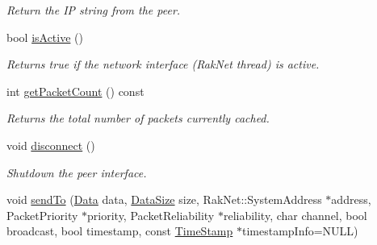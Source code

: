 \begin{DoxyCompactItemize}
\begin{DoxyCompactList}\small\item\em Return the I\-P string from the peer. \end{DoxyCompactList}\item 
\hypertarget{class_champ_net_1_1_network_a2266d0ef6af69462b1594246cea5b95d}{bool \hyperlink{class_champ_net_1_1_network_a2266d0ef6af69462b1594246cea5b95d}{is\-Active} ()}\label{class_champ_net_1_1_network_a2266d0ef6af69462b1594246cea5b95d}

\begin{DoxyCompactList}\small\item\em Returns true if the network interface (Rak\-Net thread) is active. \end{DoxyCompactList}\item 
\hypertarget{class_champ_net_1_1_network_a29e2e816288fb30919547e221d2414bf}{int \hyperlink{class_champ_net_1_1_network_a29e2e816288fb30919547e221d2414bf}{get\-Packet\-Count} () const }\label{class_champ_net_1_1_network_a29e2e816288fb30919547e221d2414bf}

\begin{DoxyCompactList}\small\item\em Returns the total number of packets currently cached. \end{DoxyCompactList}\item 
\hypertarget{class_champ_net_1_1_network_a6d06699d228d77aff9c358f79c76ed56}{void \hyperlink{class_champ_net_1_1_network_a6d06699d228d77aff9c358f79c76ed56}{disconnect} ()}\label{class_champ_net_1_1_network_a6d06699d228d77aff9c358f79c76ed56}

\begin{DoxyCompactList}\small\item\em Shutdown the peer interface. \end{DoxyCompactList}\item 
\hypertarget{class_champ_net_1_1_network_a1490e576ec8bf76357c56b16658a1aa1}{void \hyperlink{class_champ_net_1_1_network_a1490e576ec8bf76357c56b16658a1aa1}{send\-To} (\hyperlink{class_champ_net_1_1_network_af03ef34820a69b9ef3f2dc3065a29c3f}{Data} data, \hyperlink{class_champ_net_1_1_network_a5f153a3f9a1687d10922c946e2f0662e}{Data\-Size} size, Rak\-Net\-::\-System\-Address $\ast$address, Packet\-Priority $\ast$priority, Packet\-Reliability $\ast$reliability, char channel, bool broadcast, bool timestamp, const \hyperlink{struct_champ_net_1_1_time_stamp}{Time\-Stamp} $\ast$timestamp\-Info=N\-U\-L\-L)}\label{class_champ_net_1_1_network_a1490e576ec8bf76357c56b16658a1aa1}


\end{DoxyCompactItemize}
